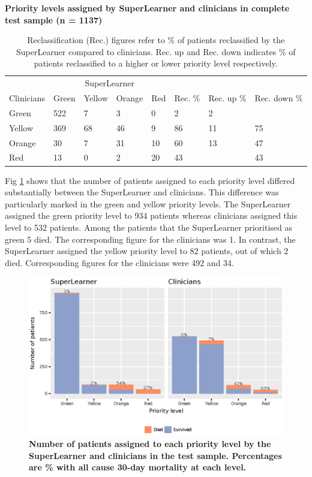 \documentclass[10pt,letterpaper]{article}\usepackage[]{graphicx}\usepackage[]{color}
\begin{document}
\begin{table}[!ht]
\centering
\caption{\bf Priority levels assigned by SuperLearner and clinicians in complete test sample (n = 1137)} 
\label{tab:reclass_all}
\begin{tabular}{llllllll}
  \hline
  & \multicolumn{4}{c}{SuperLearner} \\
 Clinicians & Green & Yellow & Orange & Red & Rec. \% & Rec. up \% & Rec. down \% \\
 \hline
Green & 522 & 7 & 3 & 0 & 2 & 2 &  \\ 
  Yellow & 369 & 68 & 46 & 9 & 86 & 11 & 75 \\ 
  Orange & 30 & 7 & 31 & 10 & 60 & 13 & 47 \\ 
  Red & 13 & 0 & 2 & 20 & 43 &  & 43 \\ 
   \hline
\end{tabular}
\caption*{Reclassification (Rec.) figures refer to \% of patients reclassified by the SuperLearner compared to clinicians. Rec. up and Rec. down indicates \% of patients reclassified to a higher or lower priority level respectively.} 
\end{table}


Fig \ref{fig:mortality_plot} shows that the number of patients assigned to each
priority level differed substantially between the SuperLearner and
clinicians. This difference was particularly marked in the green and yellow
priority levels. The SuperLearner assigned the green priority level to
934 patients whereas clinicians assigned this
level to 532 patients. Among the patients that
the SuperLearner prioritised as green 5
died. The corresponding figure for the clinicians was
1. In contrast, the SuperLearner assigned the
yellow priority level to 82 patients, out of
which 2 died. Corresponding figures for the
clinicians were 492 and
34.

\begin{figure}[!h]
  \includegraphics{mortality_plot.eps}
  \caption{\bf Number of patients assigned to each priority level by the SuperLearner and clinicians in the test sample. Percentages are \% with all cause 30-day mortality at each level.}
  \label{fig:mortality_plot} 
\end{figure}
\end{document}
